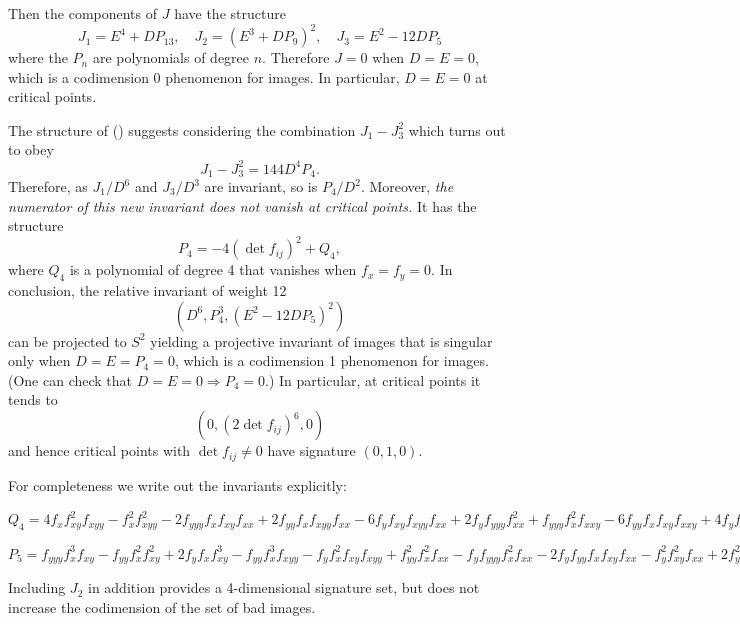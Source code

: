 \documentclass[review,onefignum,onetabnum]{siamonline190516}
\begin{document}
Then the components of $J$ have the structure
$$ J_1 = E^4 + D P_{13},\quad J_2 = (E^3 + D P_9)^2,\quad J_3=E^2 -12 D P_5$$
where the $P_n$ are polynomials of degree $n$. Therefore $J=0$ when $D=E=0$, which 
is a codimension 0 phenomenon for images. In particular, $D=E=0$ at critical points.

The structure of () suggests considering the combination $J_1 - J_3^2$ which turns out to obey
$$J_1 - J_3^2 = 144 D^4 P_4.$$
Therefore, as $J_1/D^6$ and $J_3/D^3$ are invariant, so is $P_4/D^2$. 
Moreover, {\em the numerator of this new invariant does not vanish at critical points.} 
It has the structure
$$P_4 = -4(\det f_{ij})^2 + Q_4,$$
where $Q_4$ is a polynomial of degree 4 that vanishes when $f_x=f_y=0$. In conclusion, the
relative invariant of weight 12
$$ (D^6, P_4^3, (E^2-12D P_5)^2)$$
can be projected to $S^2$ yielding a projective invariant of images that
is singular only when $D=E=P_4=0$, which is a codimension 1 phenomenon for images.
(One can check that $D=E=0\Rightarrow P_4=0$.) In particular, at critical points it tends to
$$ (0, (2\det f_{ij})^6, 0)$$
and hence critical points with $\det f_{ij}\ne 0$ have signature $(0,1,0)$.

For completeness we write out the invariants explicitly:

$Q_4=4 f_x  f_{xy} ^2 f_{xyy}  - 
f_x ^2 f_{xyy} ^2 - 
 2 f_{yyy}  f_x  f_{xy}  f_{xx}  + 
 2 f_{yy}  f_x  f_{xyy}  f_{xx}  - 
 6 f_{y}  f_{xy}  f_{xyy}  f_{xx}  + 
 2 f_{y}  f_{yyy}  f_{xx} ^2 + 
 f_{yyy}  f_x ^2 f_{xxy}  - 
 6 f_{yy}  f_x  f_{xy}  f_{xxy}  + 
 4 f_{y}  f_{xy} ^2 f_{xxy}  + 
 f_{y}  f_x  f_{xyy}  f_{xxy}  + 
 2 f_{y}  f_{yy}  f_{xx}  f_{xxy}  - 
 f_{y} ^2 f_{xxy} ^2 + 
 2 f_{yy} ^2 f_x  f_{xxx}  - 
 f_{y}  f_{yyy}  f_x  f_{xxx}  - 
 2 f_{y}  f_{yy}  f_{xy}  f_{xxx}  + f_{y} ^2 f_{xyy}  f_{xxx} $
 
$P_5=f_{yyy}  f_{x} ^3 f_{xy}  - 
f_{yy}  f_{x} ^2 f_{xy} ^2 + 
 2 f_{y}  f_{x}  f_{xy} ^3 - 
 f_{yy}  f_{x} ^3 f_{xyy}  - 
 f_{y}  f_{x} ^2 f_{xy}  f_{xyy}  + 
 f_{yy} ^2 f_{x} ^2 f_{xx}  - 
 f_{y}  f_{yyy}  f_{x} ^2 f_{xx}  - 
 2 f_{y}  f_{yy}  f_{x}  f_{xy}  f_{xx}  - 
 f_{y} ^2 f_{xy} ^2 f_{xx}  + 
 2 f_{y} ^2 f_{x}  f_{xyy}  f_{xx}  + 
 f_{y} ^2 f_{yy}  f_{xx} ^2 + 
 2 f_{y}  f_{yy}  f_{x} ^2 f_{xxy}  - 
 f_{y} ^2 f_{x}  f_{xy}  f_{xxy}  - 
 f_{y} ^3 f_{xx}  f_{xxy}  - 
 f_{y} ^2 f_{yy}  f_{x}  f_{xxx}  + 
 f_{y} ^3 f_{xy}  f_{xxx} $
 
Including $J_2$ in addition provides a 4-dimensional signature set, but does not increase the codimension of the set of bad images.
 
\end{document}
